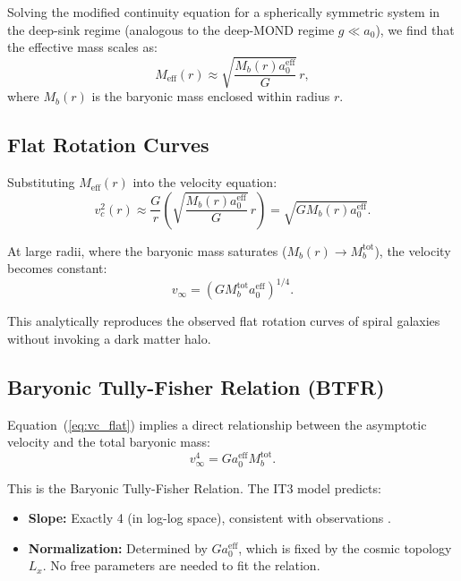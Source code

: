 \documentclass[12pt,a4paper]{article}
\begin{document}
Solving the modified continuity equation for a spherically symmetric system in the deep-sink regime (analogous to the deep-MOND regime $g \ll a_0$), we find that the effective mass scales as:
\begin{equation}
M_{\mathrm{eff}}(r) \approx \sqrt{\frac{M_b(r) a_0^{\mathrm{eff}}}{G}} \, r,
\end{equation}
where $M_b(r)$ is the baryonic mass enclosed within radius $r$.

\subsection{Flat Rotation Curves}

Substituting $M_{\mathrm{eff}}(r)$ into the velocity equation:
\begin{equation}
v_c^2(r) \approx \frac{G}{r} \left( \sqrt{\frac{M_b(r) a_0^{\mathrm{eff}}}{G}} \, r \right) = \sqrt{G M_b(r) a_0^{\mathrm{eff}}}.
\label{eq:vc_flat}
\end{equation}

At large radii, where the baryonic mass saturates ($M_b(r) \to M_b^{\mathrm{tot}}$), the velocity becomes constant:
\begin{equation}
v_{\infty} = \left(G M_b^{\mathrm{tot}} a_0^{\mathrm{eff}}\right)^{1/4}.
\end{equation}

This analytically reproduces the observed flat rotation curves of spiral galaxies without invoking a dark matter halo.

\subsection{Baryonic Tully-Fisher Relation (BTFR)}

Equation~(\ref{eq:vc_flat}) implies a direct relationship between the asymptotic velocity and the total baryonic mass:
\begin{equation}
v_{\infty}^4 = G a_0^{\mathrm{eff}} M_b^{\mathrm{tot}}.
\label{eq:btfr}
\end{equation}

This is the Baryonic Tully-Fisher Relation. The IT3 model predicts:
\begin{itemize}
    \item \textbf{Slope:} Exactly 4 (in log-log space), consistent with observations \citep{McGaugh2012}.
    \item \textbf{Normalization:} Determined by $G a_0^{\mathrm{eff}}$, which is fixed by the cosmic topology $L_x$. No free parameters are needed to fit the relation.
\end{itemize}
\end{document}
